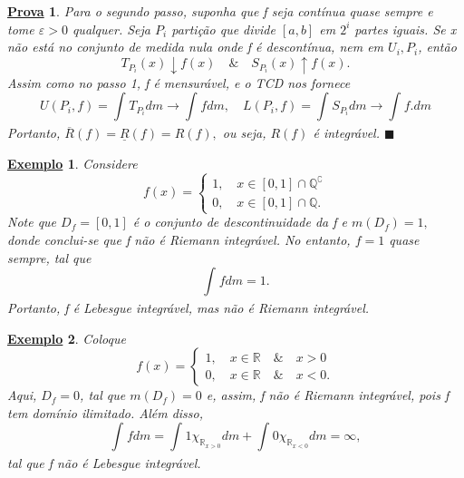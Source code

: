 \documentclass{article}
\newtheorem{example}{\underline{Exemplo}}
\newtheorem*{proof*}{\underline{Prova}}
\renewcommand\qedsymbol{$\blacksquare$}
\begin{document}
\begin{proof*}
  Para o segundo passo, suponha que f seja contínua quase sempre e tome \(\varepsilon >0\) qualquer. Seja \(P_{i}\) partição que divide \([a, b]\) em \(2^{i}\) partes iguais. Se x não está no conjunto de medida nula onde f é descontínua, nem 
  em \(U_{i}, P_{i}\), então 
    \[
      T_{P_{i}}(x)\downarrow f(x)\quad\&\quad S_{P_{i}}(x)\uparrow f(x).
    \]
  Assim como no passo 1, f é mensurável, e o TCD nos fornece 
    \[
      U(P_{i}, f) = \int_{}T_{P_{i}} dm\to \int_{}f dm,\quad L(P_{i}, f) = \int_{}S_{P_{i}} dm\to \int_{}f. dm
    \]
  Portanto, \(\overline{R}(f) = \underline{R}(f) = R(f),\) ou seja, \(R(f)\) é integrável. \qedsymbol
\end{proof*}
\begin{example}
  Considere 
    \[
      f(x) = \left\{\begin{array}{ll}
          1,\quad x\in [0,1]\cap \mathbb{Q}^{\complement}\\ 
          0,\quad x\in [0,1]\cap \mathbb{Q}.
        \end{array}\right.
    \]
    Note que \(D_{f} = [0, 1]\) é o conjunto de descontinuidade da f e \(m(D_{f}) = 1,\) donde conclui-se que f não é Riemann integrável. No entanto, 
  \(f=1\) quase sempre, tal que 
    \[
      \int_{}f dm = 1.
    \]
  Portanto, f é Lebesgue integrável, mas não é Riemann integrável. 
\end{example}
\begin{example}
  Coloque 
    \[
      f(x) = \left\{\begin{array}{ll}
          1,\quad x\in \mathbb{R} \quad \&\quad x>0\\ 
          0,\quad x\in \mathbb{R} \quad \&\quad  x < 0. 
        \end{array}\right.
    \]
  Aqui, \(D_{f} = 0\), tal que \(m(D_{f}) = 0\) e, assim, f não é Riemann integrável, pois f tem domínio ilimitado. Além disso,
    \[
      \int_{}f dm = \int_{}1 \chi_{\mathbb{R}_{x > 0}} dm + \int_{}0\chi_{\mathbb{R}_{x < 0}} dm = \infty,
    \]
  tal que f não é Lebesgue integrável.
\end{example}
\end{document}
